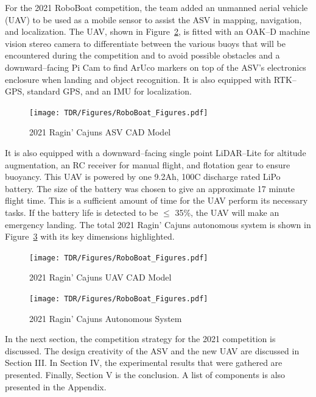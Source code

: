 \documentclass[letterpaper, 12 pt, conference]{ieeeconf}
\begin{document}
For the 2021 RoboBoat competition, the team added an unmanned aerial vehicle (UAV) to be used as a mobile sensor to assist the ASV in mapping, navigation, and localization. The UAV, shown in Figure~\ref{fig:UAV}, is fitted with an OAK--D machine vision stereo camera to differentiate between the various buoys that will be encountered during the competition and to avoid possible obstacles and a downward--facing Pi Cam to find ArUco markers on top of the ASV's electronics enclosure when landing and object recognition. It is also equipped with RTK--GPS, standard GPS, and an IMU for localization.
% 
\begin{figure}[tb]
\vspace{0.05in}
\centering
\texttt{[image: TDR/Figures/RoboBoat\_Figures.pdf]}
\caption{2021 Ragin' Cajuns ASV CAD Model}
\label{fig:RoboBoat}
\end{figure}
% 
It is also equipped with a downward--facing single point LiDAR--Lite for altitude augmentation, an RC receiver for manual flight, and flotation gear to ensure buoyancy. This UAV is powered by one 9.2Ah, 100C discharge rated LiPo battery. The size of the battery was chosen to give an approximate 17 minute flight time. This is a sufficient amount of time for the UAV perform its necessary tasks. If the battery life is detected to be $\le$ 35\%, the UAV will make an emergency landing. The total 2021 Ragin' Cajuns autonomous system is shown in Figure~\ref{fig:complete_system} with its key dimensions highlighted.
\begin{figure}[tb]
\vspace{0.09in}
\centering
\texttt{[image: TDR/Figures/RoboBoat\_Figures.pdf]}
\caption{2021 Ragin' Cajuns UAV CAD Model}
\label{fig:UAV}
\end{figure}
% 
\begin{figure}[tb]
\vspace{0.13in}
\centering
\texttt{[image: TDR/Figures/RoboBoat\_Figures.pdf]}
\caption{2021 Ragin' Cajuns Autonomous System}
\label{fig:complete_system}
\end{figure}
% 

In the next section, the competition strategy for the 2021 competition is discussed. The design creativity of the ASV and the new UAV are discussed in Section III. In Section IV, the experimental results that were gathered are presented. Finally, Section V is the conclusion. A list of components is also presented in the Appendix.
% 
\end{document}

